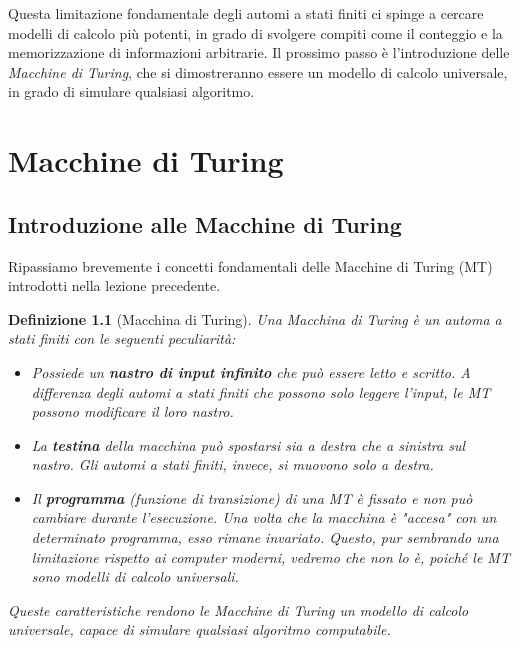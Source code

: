 \documentclass[a4paper, 11pt]{book} %
\newtheorem{definition}[theorem]{Definizione}
\theoremstyle{definition}
\begin{document}
Questa limitazione fondamentale degli automi a stati finiti ci spinge a cercare modelli di calcolo più potenti, in grado di svolgere compiti come il conteggio e la memorizzazione di informazioni arbitrarie. Il prossimo passo è l'introduzione delle \emph{Macchine di Turing}, che si dimostreranno essere un modello di calcolo universale, in grado di simulare qualsiasi algoritmo.



\chapter{Macchine di Turing}



\section{Introduzione alle Macchine di Turing}

Ripassiamo brevemente i concetti fondamentali delle Macchine di Turing (MT) introdotti nella lezione precedente.

\begin{definition}[Macchina di Turing]
Una Macchina di Turing è un automa a stati finiti con le seguenti peculiarità:
\begin{itemize}
    \item Possiede un \textbf{nastro di input infinito} che può essere letto e scritto. A differenza degli automi a stati finiti che possono solo leggere l'input, le MT possono modificare il loro nastro.
    \item La \textbf{testina} della macchina può spostarsi sia a destra che a sinistra sul nastro. Gli automi a stati finiti, invece, si muovono solo a destra.
    \item Il \textbf{programma} (funzione di transizione) di una MT è fissato e non può cambiare durante l'esecuzione. Una volta che la macchina è "accesa" con un determinato programma, esso rimane invariato. Questo, pur sembrando una limitazione rispetto ai computer moderni, vedremo che non lo è, poiché le MT sono modelli di calcolo universali.
\end{itemize}
Queste caratteristiche rendono le Macchine di Turing un modello di calcolo universale, capace di simulare qualsiasi algoritmo computabile.
\end{definition}
\end{document}
